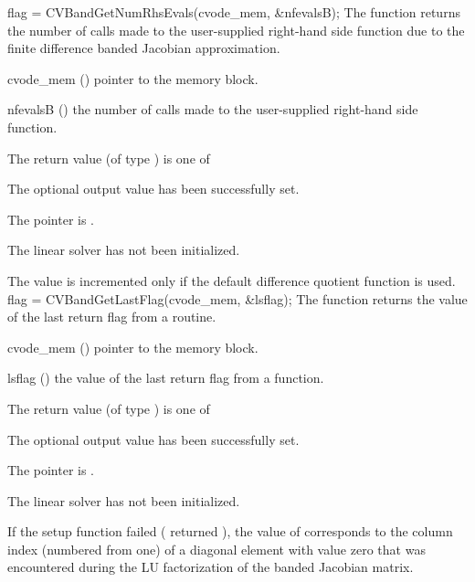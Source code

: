 {}
{
  flag = CVBandGetNumRhsEvals(cvode\_mem, \&nfevalsB);
}
{
  The function  returns the
  number of calls made to the user-supplied right-hand side function due to the 
  finite difference banded Jacobian approximation.
}
{
  \begin{args}
  \item[cvode\_mem] ()
    pointer to the {\cvodes} memory block.
  \item[nfevalsB] ()
    the number of calls made to the user-supplied right-hand side function.
  \end{args}
}
{
  The return value  (of type ) is one of
  \begin{args}
  \item[\Id{CVBAND\_SUCCESS}] 
    The optional output value has been successfully set.
  \item[\Id{CVBAND\_MEM\_NULL}]
    The  pointer is .
  \item[\Id{CVBAND\_LMEM\_NULL}]
    The {\cvband} linear solver has not been initialized.
  \end{args}
}
{
  The value  is incremented only if the default 
   difference quotient function is used.
}
{
  flag = CVBandGetLastFlag(cvode\_mem, \&lsflag);
}
{
  The function  returns the
  value of the last return flag from a {\cvband} routine. 
}
{
  \begin{args}
  \item[cvode\_mem] ()
    pointer to the {\cvodes} memory block.
  \item[lsflag] ()
    the value of the last return flag from a {\cvband} function.
  \end{args}
}
{
  The return value  (of type ) is one of
  \begin{args}
  \item[\Id{CVBAND\_SUCCESS}] 
    The optional output value has been successfully set.
  \item[\Id{CVBAND\_MEM\_NULL}]
    The  pointer is .
  \item[\Id{CVBAND\_LMEM\_NULL}]
    The {\cvband} linear solver has not been initialized.
  \end{args}
}
{
  If the {\cvband} setup function failed ( returned ),
  the value of  corresponds to the column index (numbered from one) of
  a diagonal element with value zero that was encountered during the LU factorization of the 
  banded Jacobian matrix.
}
